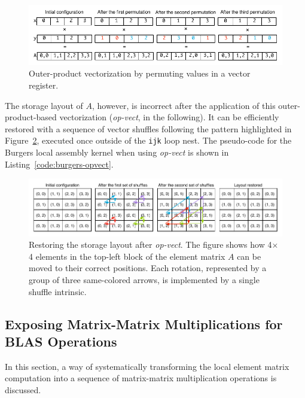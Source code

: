 \begin{figure}
\centerline{\includegraphics[scale=0.6]{coffee/pictures/vect-by-vect-inline.pdf}}
\caption{Outer-product vectorization by permuting values in a vector register.}
\label{fig:vect-by-vect}
\end{figure}

The storage layout of $A$, however, is incorrect after the application of this outer-product-based vectorization (\emph{op-vect}, in the following). It can be efficiently restored with a sequence of vector shuffles following the pattern highlighted in Figure~\ref{fig:restore-layout}, executed once outside of the \texttt{ijk} loop nest. The pseudo-code for the Burgers local assembly kernel when using \emph{op-vect} is shown in Listing~\ref{code:burgers-opvect}.

\begin{figure}
\centerline{\includegraphics[scale=0.6]{coffee/pictures/vect-restore-inline.pdf}}
\caption{Restoring the storage layout after \emph{op-vect}. The figure shows how 4$\times$4 elements in the top-left block of the element matrix $A$ can be moved to their correct positions. Each rotation, represented by a group of three same-colored arrows, is implemented by a single shuffle intrinsic.}
\label{fig:restore-layout}
\end{figure}


\subsection{Exposing Matrix-Matrix Multiplications for BLAS Operations}
\label{sec:coffee-blas}

In this section, a way of systematically transforming the local element matrix computation into a sequence of matrix-matrix multiplication operations is discussed. 

